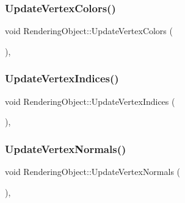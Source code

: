 \hypertarget{class_rendering_object_aca18dbb9252f27cef09df307dbcf02a9}{}\label{class_rendering_object_aca18dbb9252f27cef09df307dbcf02a9}
\subsubsection{\texorpdfstring{Update\+Vertex\+Colors()}{UpdateVertexColors()}}
{\footnotesize\ttfamily void Rendering\+Object\+::\+Update\+Vertex\+Colors (\begin{DoxyParamCaption}{ }\end{DoxyParamCaption})\hspace{0.3cm}{\ttfamily [protected]}, {\ttfamily [virtual]}}

\hypertarget{class_rendering_object_afb49054121b1b552bce58625db91b851}{}\label{class_rendering_object_afb49054121b1b552bce58625db91b851}
\subsubsection{\texorpdfstring{Update\+Vertex\+Indices()}{UpdateVertexIndices()}}
{\footnotesize\ttfamily void Rendering\+Object\+::\+Update\+Vertex\+Indices (\begin{DoxyParamCaption}{ }\end{DoxyParamCaption})\hspace{0.3cm}{\ttfamily [protected]}, {\ttfamily [virtual]}}

\hypertarget{class_rendering_object_ae4b537e1c9b1c5c50cb7b0db83e6f190}{}\label{class_rendering_object_ae4b537e1c9b1c5c50cb7b0db83e6f190}
\subsubsection{\texorpdfstring{Update\+Vertex\+Normals()}{UpdateVertexNormals()}}
{\footnotesize\ttfamily void Rendering\+Object\+::\+Update\+Vertex\+Normals (\begin{DoxyParamCaption}{ }\end{DoxyParamCaption})\hspace{0.3cm}{\ttfamily [protected]}, {\ttfamily [virtual]}}

